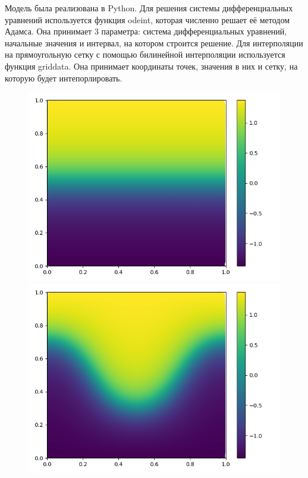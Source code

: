 \documentclass[a4paper, 14pt]{extarticle}
\begin{document}
		Модель была реализована в Python. Для решения системы дифференциальных уравнений используется функция odeint, которая численно решает её методом Адамса. Она принимает 3 параметра: система дифференциальных уравнений, начальные значения и интервал, на котором строится решение. Для интерполяции на прямоугольную сетку с помощью билинейной интерполяции используется функция griddata. Она принимает координаты точек, значения в них и сетку, на которую будет интепорлировать.
		\begin{figure}[H]
			\begin{minipage}{0.5\textwidth}
				\centering
				\includegraphics[width = \linewidth]{1.png}
			\end{minipage}\hfill
			\begin{minipage}{0.5\textwidth}
				\centering
				\includegraphics[width = \linewidth]{2.png}
			\end{minipage}\hfill
		\end{figure}
	
\end{document}
